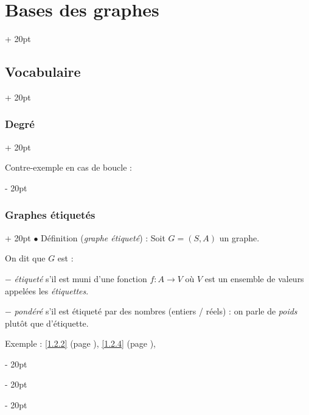 \documentclass[a4paper, 12pt, twoside]{article}
\newcommand{\ind}[1][20pt]{\advance\leftskip + #1}
\newcommand{\deind}[1][20pt]{\advance\leftskip - #1}
\newenvironment{indt}[2][20pt]{#2 \par \ind[#1]}{\par \deind} %
\begin{document}
\begin{indt}{\section{Bases des graphes}}
\begin{indt}{\subsection{Vocabulaire}}
\begin{indt}{\subsubsection{Degré}}
                \vspace{12pt}

                Contre-exemple en cas de boucle :

                \begin{center}
                \end{center}
            \end{indt}

            \vspace{12pt}
            
            \begin{indt}{\subsubsection{Graphes étiquetés}}
                $\bullet$ Définition (\textit{graphe étiqueté}) : Soit $G = (S, A)$ un graphe.

                On dit que $G$ est :

                $-$ \textit{étiqueté} s'il est muni d'une fonction $f : A \longrightarrow V$ où $V$ est un ensemble de valeurs appelées les \textit{étiquettes}.

                $-$ \textit{pondéré} s'il est étiqueté par des nombres (entiers / réels) : on parle de \textit{poids} plutôt que d'étiquette.

                Exemple : \ref{1.2.2} (page \pageref{1.2.2}), \ref{1.2.4} (page \pageref{1.2.4}),

                \begin{center}
\end{center}
\end{indt}
\end{indt}
\end{indt}
\end{document}
